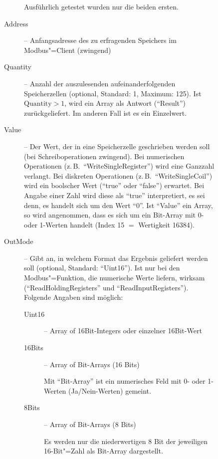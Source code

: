 \documentclass[titlepage=false,toc=nobibliography]{vl-report}
\begin{document}
\begin{description}
\begin{description}
\begin{description}
\begin{itemize}
          \end{itemize}
        Ausführlich getestet wurden nur die beiden ersten.

        \item[Address] -- Anfangsadresse des zu erfragenden Speichers im
        Modbus"=Client (zwingend)

        \item[Quantity] -- Anzahl der auszulesenden aufeinanderfolgenden
        Speicherzellen (optional, Standard: 1, Maximum: 125). Ist
        $\text{Quantity}>1$, wird ein Array als Antwort ("`Result"')
        zurückgeliefert. Im anderen Fall ist es ein Einzelwert.

        \item[Value] -- Der Wert, der in eine Speicherzelle geschrieben werden
        soll (bei Schreiboperationen zwingend). Bei numerischen Operationen
        (z.\,B.\ "`WriteSingleRegister"') wird eine Ganzzahl verlangt. Bei
        diskreten Operationen (z.\,B.\ "`WriteSingleCoil"') wird ein boolscher
        Wert ("`true"' oder "`false"') erwartet. Bei Angabe einer Zahl wird
        diese als "`true"' interpretiert, es sei denn, es handelt sich um den
        Wert "`0"'. Ist "`Value"' ein Array, so wird angenommen, dass es sich
        um ein Bit-Array mit 0- oder 1-Werten handelt (Index 15 $=$ Wertigkeit
        16384).

        \item[OutMode] -- Gibt an, in welchem Format das Ergebnis geliefert
        werden soll (optional, Standard: "`Uint16"'). Ist nur bei den
        Modbus"=Funktion, die numerische Werte liefern, wirksam
        ("`ReadHoldingRegisters"' und "`ReadInputRegisters"'). Folgende Angaben
        sind möglich:

          \begin{description}

            \item[Uint16] -- Array of 16Bit-Integers oder einzelner 16Bit-Wert
            \item[16Bits] -- Array of Bit-Arrays (16 Bits) \par\noindent
              Mit "`Bit-Array"' ist ein numerisches Feld mit 0- oder 1-Werten
              (Ja/Nein-Werten) gemeint.

            \item[8Bits] -- Array of Bit-Arrays (8 Bits) \par\noindent
              Es werden nur die niederwertigen 8 Bit der jeweiligen
              16-Bit"=Zahl als Bit-Array dargestellt.


\end{description}
\end{description}
\end{description}
\end{description}
\end{document}

